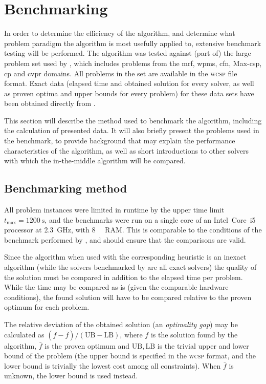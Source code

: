 \section{Benchmarking}
In order to determine the efficiency of the algorithm, and determine what problem paradigm the algorithm is most usefully applied to, extensive benchmark testing will be performed.
The algorithm was tested against (part of) the large problem set used by \textcite{deGivry14}, which includes problems from the \gls{mrf}, \gls{wpms}, \gls{cfn}, Max-\gls{csp}, \gls{cp} and \gls{cvpr} domains.
All problems in the set are available in the \textsc{wcsp} file format.
Exact data (elapsed time and obtained solution for every solver, as well as proven optima and upper bounds for every problem) for these data sets have been obtained directly from \citeauthor{deGivry14}.

This section will describe the method used to benchmark the algorithm, including the calculation of presented data.
It will also briefly present the problems used in the benchmark, to provide background that may explain the performance characteristics of the algorithm, as well as short introductions to other solvers with which the in-the-middle algorithm will be compared.

\subsection{Benchmarking method}
All problem instances were limited in runtime by the upper time limit \(t_{\text{max}} = \SI{1200}{\second}\), and the benchmarks were run on a single core of an Intel~Core~i5 processor at \SI{2.3}{\giga\hertz}, with \SI{8}{\gibi\byte} RAM.
This is comparable to the conditions of the benchmark performed by \textcite{deGivry14}, and should ensure that the comparisons are valid.

Since the algorithm when used with the corresponding heuristic is an inexact algorithm (while the solvers benchmarked by \textcite{deGivry14} are all exact solvers) the quality of the solution must be compared in addition to the elapsed time per problem.
While the time may be compared as-is (given the comparable hardware conditions), the found solution will have to be compared relative to the proven optimum for each problem.

\label{pg:bench-method}
The relative deviation of the obtained solution (an \emph{optimality gap}) may be calculated as \((f - \bar{f})/(\mathrm{UB}-\mathrm{LB})\), where \(f\) is the solution found by the algorithm, \(\bar{f}\) is the proven optimum and \(\mathrm{UB}, \mathrm{LB}\) is the trivial upper and lower bound of the problem (the upper bound is specified in the \textsc{wcsp} format, and the lower bound is trivially the lowest cost among all constraints).
When \(\bar{f}\) is unknown, the lower bound is used instead.

